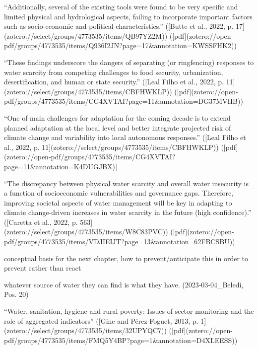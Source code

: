{“Additionally, several of the existing tools were found to be very specific and limited physical and hydrological aspects, failing to incorporate important factors such as socio-economic and political characteristics.” ([Butte et al., 2022, p. 17](zotero://select/groups/4773535/items/QB97YZ2M)) ([pdf](zotero://open-pdf/groups/4773535/items/Q936I2JN?page=17&annotation=KWSSFHK2))

“These findings underscore the dangers of separating (or ringfencing) responses to water scarcity from competing challenges to food security, urbanization, desertification, and human or state security.” ([Leal Filho et al., 2022, p. 11](zotero://select/groups/4773535/items/CBFHWKLP)) ([pdf](zotero://open-pdf/groups/4773535/items/CG4XVTAI?page=11&annotation=DG37MVHB))

“One of main challenges for adaptation for the coming decade is to extend planned adaptation at the local level and better integrate projected risk of climate change and variability into local autonomous responses.” ([Leal Filho et al., 2022, p. 11](zotero://select/groups/4773535/items/CBFHWKLP)) ([pdf](zotero://open-pdf/groups/4773535/items/CG4XVTAI?page=11&annotation=K4DUGJBX))

“The discrepancy between physical water scarcity and overall water insecurity is a function of socioeconomic vulnerabilities and governance gaps. Therefore, improving societal aspects of water management will be key in adapting to climate change-driven increases in water scarcity in the future (high confidence).” ([Caretta et al., 2022, p. 563](zotero://select/groups/4773535/items/W8C83PVC)) ([pdf](zotero://open-pdf/groups/4773535/items/VDJIEIJT?page=13&annotation=62FBCSBU))

conceptual basis for the next chapter, how to prevent/anticipate this in order to prevent rather than react

whatever source of water they can find is what they have. (2023-03-04_Beledi, Pos. 20)

“Water, sanitation, hygiene and rural poverty: Issues of sector monitoring and the role of aggregated indicators” ([Gine and Pérez-Foguet, 2013, p. 1](zotero://select/groups/4773535/items/32UPYQC7)) ([pdf](zotero://open-pdf/groups/4773535/items/FMQ5Y4BP?page=1&annotation=D4XLEESS))





}
